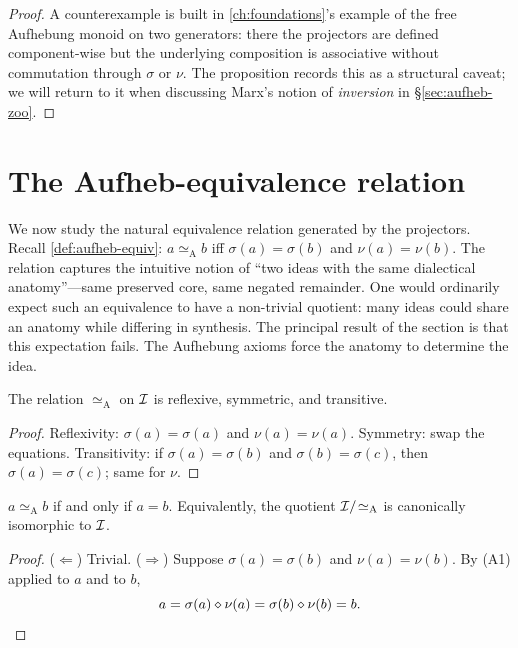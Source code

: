 \begin{proof}
A counterexample is built in \cref{ch:foundations}'s example of the
free Aufhebung monoid on two generators: there the projectors are
defined component-wise but the underlying composition is associative
without commutation through $\sigma$ or $\nu$. The proposition
records this as a structural caveat; we will return to it when
discussing Marx's notion of \emph{inversion} in
\S\ref{sec:aufheb-zoo}.
\end{proof}

\section{The Aufheb-equivalence relation}\label{sec:aufheb-equiv}

We now study the natural equivalence relation generated by the
projectors. Recall \cref{def:aufheb-equiv}: $a\simeq_{\text{A}}b$
iff $\sigma(a)=\sigma(b)$ and $\nu(a)=\nu(b)$. The relation captures
the intuitive notion of ``two ideas with the same dialectical
anatomy''---same preserved core, same negated remainder. One would
ordinarily expect such an equivalence to have a non-trivial
quotient: many ideas could share an anatomy while differing in
synthesis. The principal result of the section is that this
expectation fails. The Aufhebung axioms force the anatomy to
determine the idea.

\begin{proposition}\label{prop:equiv-rel}
The relation $\simeq_{\text{A}}$ on $\mathcal{I}$ is reflexive, symmetric,
and transitive.
\end{proposition}

\begin{proof}
Reflexivity: $\sigma(a)=\sigma(a)$ and $\nu(a)=\nu(a)$. Symmetry:
swap the equations. Transitivity: if $\sigma(a)=\sigma(b)$ and
$\sigma(b)=\sigma(c)$, then $\sigma(a)=\sigma(c)$; same for $\nu$.
\end{proof}

\begin{theorem}\label{thm:quotient-collapse}
$a\simeq_{\text{A}}b$ if and only if $a=b$. Equivalently, the
quotient $\mathcal{I}/\!\simeq_{\text{A}}$ is canonically isomorphic to
$\mathcal{I}$.
\end{theorem}

\begin{proof}
($\Leftarrow$) Trivial. ($\Rightarrow$) Suppose $\sigma(a)=\sigma(b)$
and $\nu(a)=\nu(b)$. By (A1) applied to $a$ and to $b$,
\[
a=\sigma(a)\mathbin{\diamond}\nu(a)=\sigma(b)\mathbin{\diamond}\nu(b)=b.
\]
\end{proof}

